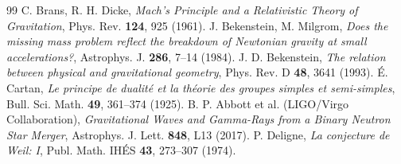 \documentclass[11pt,a4paper]{article}
\begin{document}
\begin{thebibliography}{99}
 C. Brans, R. H. Dicke, \textit{Mach's Principle and a Relativistic Theory of Gravitation}, Phys. Rev. \textbf{124}, 925 (1961).
 J. Bekenstein, M. Milgrom, \textit{Does the missing mass problem reflect the breakdown of Newtonian gravity at small accelerations?}, Astrophys. J. \textbf{286}, 7--14 (1984).
 J. D. Bekenstein, \textit{The relation between physical and gravitational geometry}, Phys. Rev. D \textbf{48}, 3641 (1993).
 {\'E}. Cartan, \textit{Le principe de dualit{\'e} et la th{\'e}orie des groupes simples et semi-simples}, Bull. Sci. Math. \textbf{49}, 361--374 (1925).
 B. P. Abbott et al. (LIGO/Virgo Collaboration), \textit{Gravitational Waves and Gamma-Rays from a Binary Neutron Star Merger}, Astrophys. J. Lett. \textbf{848}, L13 (2017).
 P. Deligne, \textit{La conjecture de Weil: I}, Publ. Math. IH{\'E}S \textbf{43}, 273--307 (1974).
\end{thebibliography}
\end{document}
